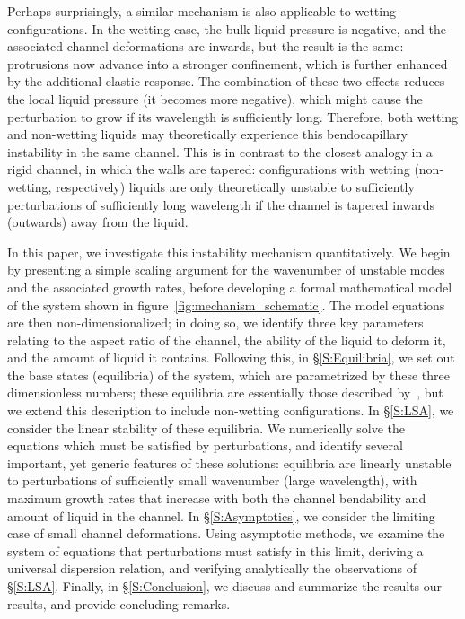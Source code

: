 \documentclass{jfm}
\begin{document}
Perhaps surprisingly, a similar mechanism is also applicable to wetting configurations. In the wetting case, the bulk liquid pressure is negative, and the associated channel deformations are inwards, but the result is the same: protrusions now advance into a stronger confinement, which is further enhanced by the additional elastic response. The combination of these two effects reduces the local liquid pressure (it becomes more negative), which might cause the perturbation to grow if its wavelength is sufficiently long. Therefore, both wetting and non-wetting liquids may theoretically experience this bendocapillary instability in the same channel. This is in contrast to the closest analogy in a rigid channel, in which the walls are tapered: configurations with wetting (non-wetting, respectively) liquids are only theoretically unstable to sufficiently perturbations of sufficiently long wavelength if the channel is tapered inwards (outwards) away from the liquid.

In this paper, we investigate this instability mechanism quantitatively. We begin by presenting a simple scaling argument for the wavenumber of unstable modes and the associated growth rates, before developing a formal mathematical model of the system shown in figure~\ref{fig:mechanism_schematic}. The model equations are then non-dimensionalized; in doing so, we identify three key parameters relating to the aspect ratio of the channel, the ability of the liquid to deform it, and the amount of liquid it contains. Following this, in \S\ref{S:Equilibria}, we set out the base states (equilibria) of the system, which are parametrized by these three dimensionless numbers; these equilibria are essentially those described by~\citet{Taroni2012JFM}, but we extend this description to include non-wetting configurations. In \S\ref{S:LSA}, we consider the linear stability of these equilibria. We numerically solve the equations which must be satisfied by perturbations, and identify several important, yet generic features of these solutions: equilibria are linearly unstable to perturbations of sufficiently small wavenumber (large wavelength), with maximum growth rates that increase with both the channel bendability and amount of liquid in the channel. In \S\ref{S:Asymptotics}, we consider the limiting case of small channel deformations. Using asymptotic methods, we examine the system of equations that perturbations must satisfy in this limit, deriving a universal dispersion relation, and verifying analytically the observations of \S\ref{S:LSA}. Finally, in \S\ref{S:Conclusion}, we discuss and summarize the results our results, and provide concluding remarks.
\end{document}
